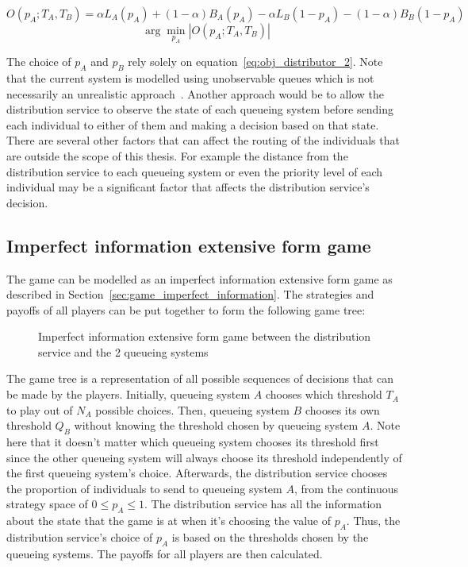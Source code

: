 \begin{equation*}
    O(p_A; T_A, T_B) = \alpha L_A(p_A) + (1 - \alpha) B_A(p_A) -
    \alpha L_B(1 - p_A) - (1 - \alpha)B_B(1 - p_A)
\end{equation*}
\begin{equation}\label{eq:obj_distributor_2}
    \arg \min_{p_A} |O(p_A; T_A, T_B)|
\end{equation}


The choice of \(p_A\) and \(p_B\) rely solely on
equation~\eqref{eq:obj_distributor_2}.
Note that the current system is modelled using unobservable queues which is not
necessarily an unrealistic approach~\cite{unobservablequeue}.
Another approach would be to allow the distribution service to observe the
state of each queueing system before sending each individual to either of them
and making a decision based on that state.
There are several other factors that can affect the routing of the
individuals that are outside the scope of this thesis.
For example the distance from the distribution service to each queueing system
or even the priority level of each individual may be a significant factor that
affects the distribution service's decision.



\subsection{Imperfect information extensive form game}

The game can be modelled as an imperfect information extensive form game as
described in Section~\ref{sec:game_imperfect_information}.
The strategies and payoffs of all players can be put together to form the
following game tree:

\begin{figure}[H]
    \centering
    
    \caption{Imperfect information extensive form game between the distribution
    service and the 2 queueing systems}
    \label{fig:imperfect_info_game}
\end{figure}

The game tree is a representation of all possible sequences of decisions that
can be made by the players.
Initially, queueing system \(A\) chooses which threshold \(T_A\) to play out of
\(N_A\) possible choices.
Then, queueing system \(B\) chooses its own threshold \(Q_B\) without knowing
the threshold chosen by queueing system \(A\).
Note here that it doesn't matter which queueing system chooses its threshold
first since the other queueing system will always choose its threshold
independently of the first queueing system's choice.
Afterwards, the distribution service chooses the proportion of individuals to
send to queueing system \(A\), from the continuous strategy space of
\(0 \leq p_A \leq 1\).
The distribution service has all the information about the state that the game
is at when it's choosing the value of \(p_A\).
Thus, the distribution service's choice of \(p_A\) is based on the thresholds
chosen by the queueing systems.
The payoffs for all players are then calculated.